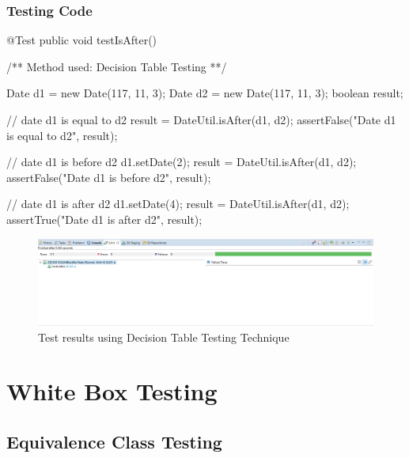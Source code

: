 \documentclass[fontsize=12pt,paper=letter,twoside]{scrartcl}
\begin{document}
\newpage
\subsubsection{Testing Code}
\begin{code}
	@Test
	public void testIsAfter() {
		/** Method used: Decision Table Testing **/
		
		Date d1 = new Date(117, 11, 3);
		Date d2 = new Date(117, 11, 3);
		boolean result;
		
		// date d1 is equal to d2
		result = DateUtil.isAfter(d1, d2);
		assertFalse("Date d1 is equal to d2", result);
		
		// date d1 is before d2
		d1.setDate(2);
		result = DateUtil.isAfter(d1, d2);
		assertFalse("Date d1 is before d2", result);
		
		// date d1 is after d2
		d1.setDate(4);
		result = DateUtil.isAfter(d1, d2);
		assertTrue("Date d1 is after d2", result);
	}
\end{code}

\begin{figure}[!htb]
\begin{center}
\includegraphics[width=.99\textwidth]{images/bbt/dtt.png}
\end{center}
\caption{Test results using Decision Table Testing Technique}
\label{fig:bbt_dtt}
\end{figure}

\newpage
\section{White Box Testing}


\subsection {Equivalence Class Testing}
\end{document}
